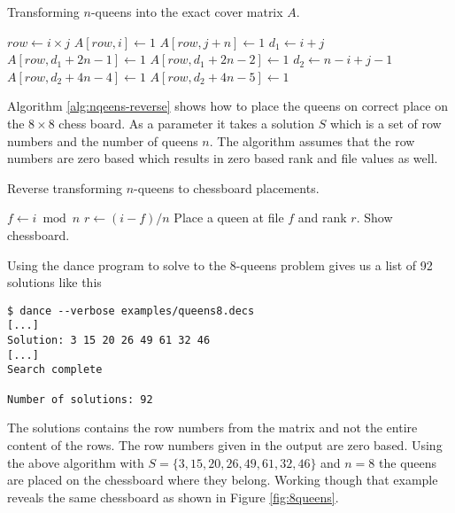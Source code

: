 \begin{algorithm}[H]
	\caption{Transforming $n$-queens into the exact cover matrix $A$.}
	\label{alg:nqeens-cover}
	\begin{distribalgo}[1]
					\STATE $row \leftarrow i \times j$
					\STATE $A[row,i] \leftarrow 1$  
					\STATE $A[row,j+n] \leftarrow 1$  
					\STATE $d_1 \leftarrow i + j$  
							\STATE $A[row,d_1 + 2n - 1] \leftarrow 1$
						\ELSE
							\STATE $A[row,d_1 + 2n - 2] \leftarrow 1$
						\ENDIF
					\ENDIF
					\STATE $d_2 \leftarrow n - i + j - 1$  
							\STATE $A[row,d_2 + 4n - 4] \leftarrow 1$
						\ELSE
							\STATE $A[row,d_2 + 4n - 5] \leftarrow 1$
						\ENDIF
					\ENDIF
				\ENDFOR
			\ENDFOR
		\ENDPROC
	\end{distribalgo}
\end{algorithm}

Algorithm \ref{alg:nqeens-reverse} shows how to place the queens on correct place on the $8 \times 8$ chess board.
As a parameter it takes a solution $S$ which is a set of row numbers and the number of queens $n$.
The algorithm assumes that the row numbers are zero based which results in zero based rank and file values as well.
\begin{algorithm}[H]
	\caption{Reverse transforming $n$-queens to chessboard placements.}
	\label{alg:nqeens-reverse}
	\begin{distribalgo}[1]
				\STATE $f \leftarrow i \bmod n$
				\STATE $r \leftarrow (i - f) / n$
				\STATE Place a queen at file $f$ and rank $r$.
			\ENDFOR
			\STATE Show chessboard.
		\ENDPROC
	\end{distribalgo}
\end{algorithm}

\begin{example}
Using the dance program to solve to the 8-queens problem gives us a list of 92 solutions like this
\begin{verbatim}
$ dance --verbose examples/queens8.decs
[...]
Solution: 3 15 20 26 49 61 32 46
[...]
Search complete

Number of solutions: 92
\end{verbatim}
The solutions contains the row numbers from the matrix and not the entire content of the rows.
The row numbers given in the output are zero based.
Using the above algorithm with $S = \{3, 15, 20, 26, 49, 61, 32, 46\}$ and $n = 8$ the queens are placed on the chessboard where they belong.
Working though that example reveals the same chessboard as shown in Figure \ref{fig:8queens}.
\end{example}




